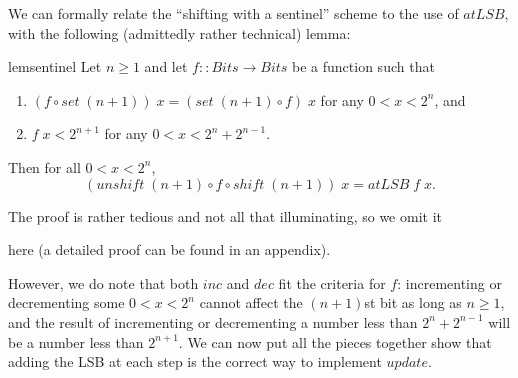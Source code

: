 \documentclass{jfp}
\newcommand{\Conid}[1]{\mathit{#1}}
\newcommand{\Varid}[1]{\mathit{#1}}
\renewcommand{\geq}{\geqslant}
\theoremstyle{definition}
\theoremstyle{remark}
\newif\ifJFP
\begin{document}
We can formally relate the ``shifting with a sentinel'' scheme to
the use of \ensuremath{\Varid{atLSB}}, with the following (admittedly rather technical)
lemma:

\begin{restatable}{lem}{sentinel} \label{lem:sentinel-scheme} Let $n \geq 1$ and let \ensuremath{\Varid{f}\mathbin{::}\Conid{Bits}\to \Conid{Bits}} be a function such that
  \begin{enumerate}
  \item \ensuremath{(\Varid{f}\mathbin{\circ}\Varid{set}\;(\Varid{n}\mathbin{+}\mathrm{1}))\;\Varid{x}\mathrel{=}(\Varid{set}\;(\Varid{n}\mathbin{+}\mathrm{1})\mathbin{\circ}\Varid{f})\;\Varid{x}} for any $0 < x < 2^n$, and
  \item $\ensuremath{\Varid{f}\;\Varid{x}} < 2^{n+1}$ for any $0 < x < 2^n + 2^{n-1}$.
  \end{enumerate}
  Then for all $0 < x < 2^n$,
  \[ \ensuremath{(\Varid{unshift}\;(\Varid{n}\mathbin{+}\mathrm{1})\mathbin{\circ}\Varid{f}\mathbin{\circ}\Varid{shift}\;(\Varid{n}\mathbin{+}\mathrm{1}))\;\Varid{x}\mathrel{=}\Varid{atLSB}\;\Varid{f}\;\Varid{x}}. \]
\end{restatable}

The proof is rather tedious and not all that illuminating, so we omit
it
\ifJFP
(an extended version including a full proof may be found on the
author's website).
\else
here (a detailed proof can be found in an appendix).
\fi
However, we do note that both \ensuremath{\Varid{inc}} and
\ensuremath{\Varid{dec}} fit the criteria for \ensuremath{\Varid{f}}: incrementing or decrementing some
$0 < x < 2^n$ cannot affect the $(n+1)$st bit as long as $n \geq 1$,
and the result of incrementing or decrementing a number less than
$2^n + 2^{n-1}$ will be a number less than $2^{n+1}$.  We can
now put all the pieces together show that adding the LSB at each step
is the correct way to implement \ensuremath{\Varid{update}}.
\end{document}
